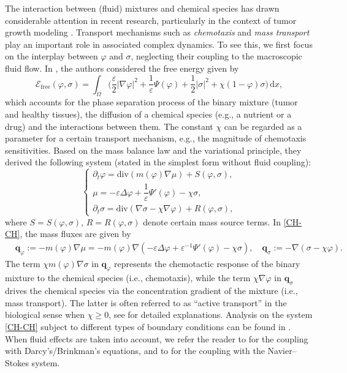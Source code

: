 \documentclass[11pt,reqno]{amsart}
\def\div{\mathrm{div}}
\begin{document}
The interaction between (fluid) mixtures and chemical species has drawn considerable attention in recent research, particularly in the context of tumor growth modeling \cite{CL10,GLSS,Hawk2011,Oden10}. Transport mechanisms such as \textit{chemotaxis} and \textit{mass transport} play an important role in associated complex dynamics. To see this, we first focus on the interplay between $\varphi$ and $\sigma$, neglecting their coupling to the macroscopic fluid flow. In \cite{GLSS}, the authors considered the free energy given by
$$
\mathcal{E}_{\text{free}}(\varphi, \sigma)= \int_{\Omega}\Big( \frac{\varepsilon}{2}|\nabla \varphi|^{2}
+ \frac{1}{\varepsilon}\Psi(\varphi)
+ \frac{1}{2}|\sigma|^2 + \chi (1-\varphi)\sigma \Big)\, \mathrm{d} x,
$$
which accounts for the phase separation process of the binary mixture (tumor and healthy tissues), the diffusion of a chemical species (e.g., a nutrient or a drug) and the interactions between them. The constant $\chi$ can be regarded as a parameter for a certain transport mechanism, e.g., the magnitude of chemotaxis sensitivities. Based on the mass balance law and the variational principle, they derived the following system (stated in the simplest form without fluid coupling):
%
\begin{equation}
\begin{cases}
\partial_t \varphi = \div(m(\varphi)\nabla \mu) +S(\varphi,\sigma),\\
\mu= -\varepsilon \Delta \varphi+ \dfrac{1}{\varepsilon} \Psi'(\varphi) -\chi \sigma,\\
\partial_t \sigma =\div(\nabla \sigma -\chi \nabla \varphi) +R(\varphi, \sigma),
\end{cases}
\label{CH-CH}
\end{equation}
%
where $S=S(\varphi, \sigma)$, $R=R(\varphi, \sigma)$ denote certain mass source terms.
In \eqref{CH-CH}, the mass fluxes are given by
%
\begin{align*}
&\bm{q}_\varphi:= -m(\varphi)\nabla \mu= -m(\varphi)\nabla( - \varepsilon\Delta \varphi + \varepsilon^{-1}\Psi'(\varphi)-\chi \sigma),
\quad
\bm{q}_\sigma:=-\nabla(\sigma -\chi \varphi).
\end{align*}
%
The term $\chi m(\varphi)\nabla \sigma$ in $\bm{q}_\varphi$ represents the chemotactic response of the binary mixture to the chemical species (i.e., chemotaxis), while the term $\chi \nabla \varphi$ in $\bm{q}_\sigma$ drives the chemical species via the concentration gradient of the mixture (i.e., mass transport). The latter is often referred to as ``active transport'' in the biological sense when $\chi\geq 0$, see \cite{GLSS} for detailed explanations. Analysis on the system \eqref{CH-CH} subject to different types of boundary conditions can be found in \cite{GLam17a,GLam17b}. When fluid effects are taken into account, we refer the reader to \cite{CGSS23,EG19jde,GLSS,FLRS18,KS22} for the coupling with Darcy's/Brinkman's equations, and to \cite{H,HW,HW24,LW2018} for the coupling with the Navier--Stokes system.
\end{document}
